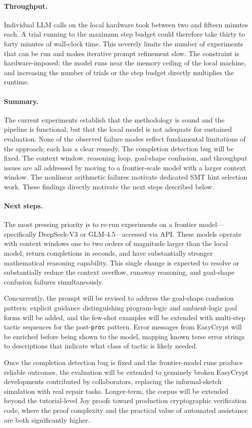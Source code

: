 \documentclass[acmsmall,natbib=false]{acmart}
\begin{document}
\paragraph{Throughput.} Individual LLM calls on the local hardware took between two and fifteen minutes each. A trial running to the maximum step budget could therefore take thirty to forty minutes of wall-clock time. This severely limits the number of experiments that can be run and makes iterative prompt refinement slow. The constraint is hardware-imposed: the model runs near the memory ceiling of the local machine, and increasing the number of trials or the step budget directly multiplies the runtime.

\paragraph{Summary.} The current experiments establish that the methodology is sound and the pipeline is functional, but that the local model is not adequate for sustained evaluation. None of the observed failure modes reflect fundamental limitations of the approach; each has a clear remedy. The completion detection bug will be fixed. The context window, reasoning loop, goal-shape confusion, and throughput issues are all addressed by moving to a frontier-scale model with a larger context window. The nonlinear arithmetic failures motivate dedicated SMT hint selection work. These findings directly motivate the next steps described below.

\paragraph{Next steps.} The most pressing priority is to re-run experiments on a frontier model---specifically DeepSeek-V3 or GLM-4.5---accessed via API. These models operate with context windows one to two orders of magnitude larger than the local model, return completions in seconds, and have substantially stronger mathematical reasoning capability. This single change is expected to resolve or substantially reduce the context overflow, runaway reasoning, and goal-shape confusion failures simultaneously.

Concurrently, the prompt will be revised to address the goal-shape confusion pattern: explicit guidance distinguishing program-logic and ambient-logic goal forms will be added, and the few-shot examples will be extended with multi-step tactic sequences for the post-\texttt{proc} pattern. Error messages from EasyCrypt will be enriched before being shown to the model, mapping known terse error strings to descriptions that indicate what class of tactic is likely needed.

Once the completion detection bug is fixed and the frontier-model runs produce reliable outcomes, the evaluation will be extended to genuinely broken EasyCrypt developments contributed by collaborators, replacing the informal-sketch simulation with real repair tasks. Longer-term, the corpus will be extended beyond the tutorial-level Joy proofs toward production cryptographic verification code, where the proof complexity and the practical value of automated assistance are both significantly higher.
\printbibliography
\end{document}
